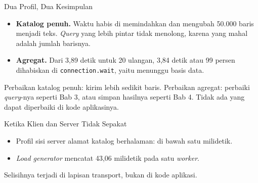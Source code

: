 \documentclass[aspectratio=169, table, 12pt]{beamer}
\begin{document}
\begin{frame}{{\Large Dua Profil, Dua Kesimpulan}}
  \vspace{12pt}
  \begin{itemize}
    \item \textbf{Katalog penuh.} Waktu habis di memindahkan dan mengubah
          50.000 baris menjadi teks. \textit{Query} yang lebih pintar tidak menolong,
          karena yang mahal adalah jumlah barisnya.
    \item \textbf{Agregat.} Dari 3,89 detik untuk 20 ulangan, 3,84 detik atau
          99 persen dihabiskan di \texttt{connection.wait}, yaitu menunggu
          basis data.
  \end{itemize}
  \vspace{8pt}
  {\footnotesize Perbaikan katalog penuh: kirim lebih sedikit baris.
  Perbaikan agregat: perbaiki \textit{query}-nya seperti Bab 3, atau simpan hasilnya
  seperti Bab 4. Tidak ada yang dapat diperbaiki di kode aplikasinya.}
\end{frame}

\begin{frame}{{\Large Ketika Klien dan Server Tidak Sepakat}}
  \vspace{6pt}
  \begin{itemize}
    \item Profil sisi server alamat katalog berhalaman: di bawah satu
          milidetik.
    \item \textit{Load generator} mencatat 43,06 milidetik pada satu
          \textit{worker}.
  \end{itemize}
  \vspace{4pt}
  \centering

  \vspace{6pt}
  {\small Selisihnya terjadi di lapisan transport, bukan di kode aplikasi.}
\end{frame}
\end{document}
